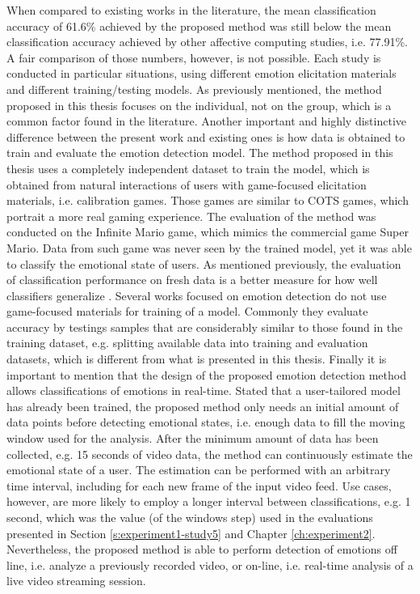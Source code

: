 When compared to existing works in the literature, the mean classification accuracy of 61.6\% achieved by the proposed method was still below the mean classification accuracy achieved by other affective computing studies, i.e. 77.91\%. A fair comparison of those numbers, however, is not possible. Each study is conducted in particular situations, using different emotion elicitation materials and different training/testing models. As previously mentioned, the method proposed in this thesis focuses on the individual, not on the group, which is a common factor found in the literature. Another important and highly distinctive difference between the present work and existing ones is how data is obtained to train and evaluate the emotion detection model. The method proposed in this thesis uses a completely independent dataset to train the model, which is obtained from natural interactions of users with game-focused elicitation materials, i.e. calibration games. Those games are similar to COTS games, which portrait a more real gaming experience. The evaluation of the method was conducted on the Infinite Mario game, which mimics the commercial game Super Mario. Data from such game was never seen by the trained model, yet it was able to classify the emotional state of users. As mentioned previously, the evaluation of classification performance on fresh data is a better measure for how well classifiers generalize \parencite[Chapter 5]{james2013introduction}. Several works focused on emotion detection do not use game-focused materials for training of a model. Commonly they evaluate accuracy by testings samples that are considerably similar to those found in the training dataset, e.g. splitting available data into training and evaluation datasets, which is different from what is presented in this thesis. Finally it is important to mention that the design of the proposed emotion detection method allows classifications of emotions in real-time. Stated that a user-tailored model has already been trained, the proposed method only needs an initial amount of data points before detecting emotional states, i.e. enough data to fill the moving window used for the analysis. After the minimum amount of data has been collected, e.g. 15 seconds of video data, the method can continuously estimate the emotional state of a user. The estimation can be performed with an arbitrary time interval, including for each new frame of the input video feed. Use cases, however, are more likely to employ a longer interval between classifications, e.g. 1 second, which was the value (of the windows step) used in the evaluations presented in Section \ref{s:experiment1-study5} and Chapter \ref{ch:experiment2}. Nevertheless, the proposed method is able to perform detection of emotions off line, i.e. analyze a previously recorded video, or on-line, i.e. real-time analysis of a live video streaming session.


